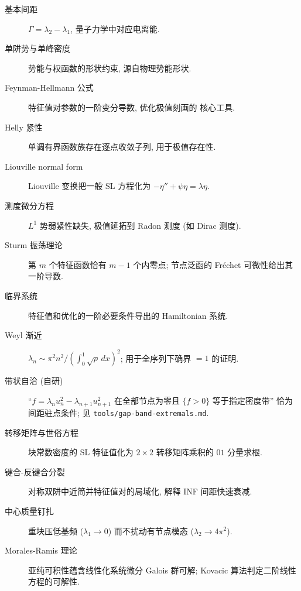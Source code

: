 \documentclass[UTF8]{ctexart}
\begin{document}
\begin{description}
	\item[基本间距] $\Gamma = \lambda_2 - \lambda_1$, 量子力学中对应电离能.
	\item[单阱势与单峰密度] 势能与权函数的形状约束, 源自物理势能形状.
	\item[Feynman-Hellmann 公式] 特征值对参数的一阶变分导数, 优化极值刻画的
		核心工具.
	\item[Helly 紧性] 单调有界函数族存在逐点收敛子列, 用于极值存在性.
	\item[Liouville normal form] Liouville 变换把一般 SL 方程化为
		$-\eta'' + \psi\eta = \lambda\eta$.
	\item[测度微分方程] $L^1$ 势弱紧性缺失, 极值延拓到 Radon 测度 (如
		Dirac 测度).
	\item[Sturm 振荡理论] 第 $m$ 个特征函数恰有 $m-1$ 个内零点; 节点泛函的
		Fr\'echet 可微性给出其一阶导数.
	\item[临界系统] 特征值和优化的一阶必要条件导出的 Hamiltonian 系统.
	\item[Weyl 渐近] $\lambda_n \sim \pi^2 n^2/(\int_0^1\sqrt{\rho}\,dx)^2$; 用于全序列下确界 $= 1$ 的证明.
	\item[带状自洽 (自研)] ``$f = \lambda_n u_n^2 - \lambda_{n+1}u_{n+1}^2$ 在全部节点为零且 $\{f>0\}$ 等于指定密度带'' 恰为间距驻点条件; 见 \texttt{tools/gap-band-extremals.md}.
	\item[转移矩阵与世俗方程] 块常数密度的 SL 特征值化为 $2\times2$ 转移矩阵乘积的 $01$ 分量求根.
	\item[键合-反键合分裂] 对称双阱中近简并特征值对的局域化, 解释 INF 间距快速衰减.
	\item[中心质量钉扎] 重块压低基频 ($\lambda_1\to0$) 而不扰动有节点模态 ($\lambda_2\to4\pi^2$).
	\item[Morales-Ramis 理论] 亚纯可积性蕴含线性化系统微分 Galois 群可解;
		Kovacic 算法判定二阶线性方程的可解性.
\end{description}
\end{document}
